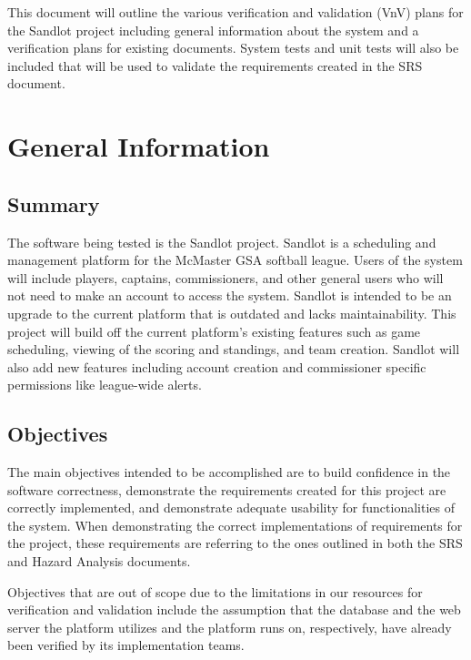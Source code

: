 \documentclass[12pt, titlepage]{article}
\begin{document}
\newpage


This document will outline the various verification and validation (VnV) plans
for the Sandlot project including general information about the system and a
verification plans for existing documents. System tests and unit tests will
also be included that will be used to validate the requirements created in the
SRS document.

\section{General Information}

\subsection{Summary}

The software being tested is the Sandlot project. Sandlot is a scheduling and
management platform for the McMaster GSA softball league. Users of the system
will include players, captains, commissioners, and other general users who will
not need to make an account to access the system. Sandlot is intended to be an
upgrade to the current platform that is outdated and lacks maintainability. This
project will build off the current platform's existing features such as game
scheduling, viewing of the scoring and standings, and team creation. Sandlot will
also add new features including account creation and commissioner specific
permissions like league-wide alerts.

\subsection{Objectives}

The main objectives intended to be accomplished are to build confidence in the software
correctness, demonstrate the requirements created for this project are correctly
implemented, and demonstrate adequate usability for functionalities of the
system. When demonstrating the correct implementations of requirements for the
project, these requirements are referring to the ones outlined in both the
SRS and Hazard Analysis documents.

Objectives that are out of scope due to the limitations in our resources for
verification and validation include the assumption that the database and the web
server the platform utilizes and the platform runs on, respectively, have already
been verified by its implementation teams.
\end{document}
